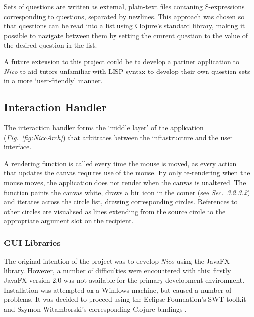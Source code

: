\documentclass[12pt,twoside,notitlepage,xetex]{report}
\begin{document}
Sets of questions are written as external, plain-text files contaning S-expressions corresponding to questions, separated by newlines.  This approach was chosen so that questions can be read into a list using Clojure's standard library, making it possible to navigate between them by setting the current question to the value of the desired question in the list.

A future extension to this project could be to develop a partner application to \emph{Nico} to aid tutors unfamiliar with LISP syntax to develop their own question sets in a more `user-friendly' manner.

\subsection{Interaction Handler}
%

The interaction handler forms the `middle layer' of the application (\emph{Fig.~\ref{fig:NicoArch}}) that arbitrates between the infrastructure and the user interface.

A rendering function is called every time the mouse is moved, as every action that updates the canvas requires use of the mouse.  By only re-rendering when the mouse moves, the application does not render when the canvas is unaltered.  The function paints the canvas white, draws a bin icon in the corner (see \emph{Sec.~3.2.3.2}) and iterates across the circle list, drawing corresponding circles.  References to other circles are visualised as lines extending from the source circle to the appropriate argument slot on the recipient.

\subsubsection{GUI Libraries}

The original intention of the project was to develop \emph{Nico} using the JavaFX library. However, a number of difficulties were encountered with this: firstly, JavaFX version 2.0 was not available for the primary development environment.  Installation was attempted on a Windows machine, but caused a number of problems. It was decided to proceed using the Eclipse Foundation's SWT toolkit and Szymon Witamborski's corresponding Clojure bindings \cite{GuiFtw}.
\end{document}
